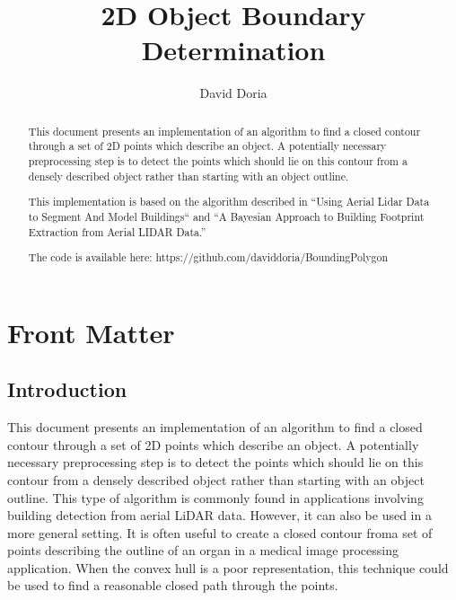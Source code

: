 \documentclass{InsightArticle}
\title{2D Object Boundary Determination}
\author{David Doria}
\newcommand{\IJhandlerIDnumber}{3250}
\begin{document}
\IJhandlefooter{\IJhandlerIDnumber}


\ifpdf
\else
\fi


\maketitle


\ifhtml
\chapter*{Front Matter\label{front}}
\fi

\begin{abstract}
\noindent

This document presents an implementation of an algorithm to find a closed contour through a set of 2D points which describe an object. A potentially necessary preprocessing step is to detect the points which should lie on this contour from a densely described object rather than starting with an object outline.

This implementation is based on the algorithm described in ``Using Aerial Lidar Data to Segment And Model Buildings`` and ``A Bayesian Approach to Building Footprint Extraction from Aerial LIDAR Data.''

The code is available here:
https://github.com/daviddoria/BoundingPolygon

\end{abstract}

\IJhandlenote{\IJhandlerIDnumber}

\tableofcontents
\section{Introduction}
This document presents an implementation of an algorithm to find a closed contour through a set of 2D points which describe an object. A potentially necessary preprocessing step is to detect the points which should lie on this contour from a densely described object rather than starting with an object outline. This type of algorithm is commonly found in applications involving building detection from aerial LiDAR data. However, it can also be used in a more general setting. It is often useful to create a closed contour froma set of points describing the outline of an organ in a medical image processing application. When the convex hull is a poor representation, this technique could be used to find a reasonable closed path through the points. 
\end{document}
